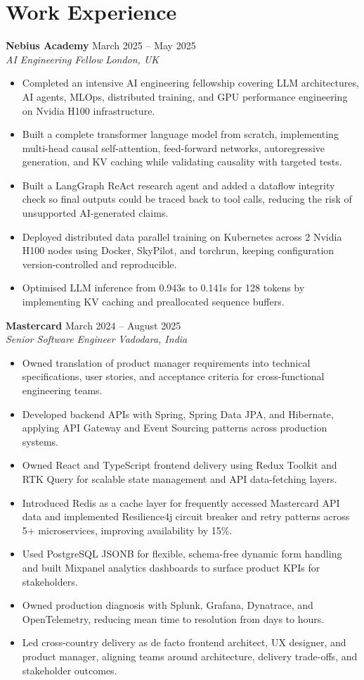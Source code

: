 \documentclass[a4paper,10pt]{article}
\newcommand{\role}[4]{
  \textbf{\color{accent}#1} \hfill {\small #2}\\
  \textit{#3} \hfill {\small \textit{#4}}
}
\begin{document}
\section{Work Experience}
\role{Nebius Academy}{March 2025 -- May 2025}{AI Engineering Fellow}{London, UK}
\begin{itemize}
  \item Completed an intensive AI engineering fellowship covering LLM architectures, AI agents, MLOps, distributed training, and GPU performance engineering on Nvidia H100 infrastructure.
  \item Built a complete transformer language model from scratch, implementing multi-head causal self-attention, feed-forward networks, autoregressive generation, and KV caching while validating causality with targeted tests.
  \item Built a LangGraph ReAct research agent and added a dataflow integrity check so final outputs could be traced back to tool calls, reducing the risk of unsupported AI-generated claims.
  \item Deployed distributed data parallel training on Kubernetes across 2 Nvidia H100 nodes using Docker, SkyPilot, and torchrun, keeping configuration version-controlled and reproducible.
  \item Optimised LLM inference from 0.943s to 0.141s for 128 tokens by implementing KV caching and preallocated sequence buffers.
\end{itemize}

\role{Mastercard}{March 2024 -- August 2025}{Senior Software Engineer}{Vadodara, India}
\begin{itemize}
  \item Owned translation of product manager requirements into technical specifications, user stories, and acceptance criteria for cross-functional engineering teams.
  \item Developed backend APIs with Spring, Spring Data JPA, and Hibernate, applying API Gateway and Event Sourcing patterns across production systems.
  \item Owned React and TypeScript frontend delivery using Redux Toolkit and RTK Query for scalable state management and API data-fetching layers.
  \item Introduced Redis as a cache layer for frequently accessed Mastercard API data and implemented Resilience4j circuit breaker and retry patterns across 5+ microservices, improving availability by 15\%.
  \item Used PostgreSQL JSONB for flexible, schema-free dynamic form handling and built Mixpanel analytics dashboards to surface product KPIs for stakeholders.
  \item Owned production diagnosis with Splunk, Grafana, Dynatrace, and OpenTelemetry, reducing mean time to resolution from days to hours.
  \item Led cross-country delivery as de facto frontend architect, UX designer, and product manager, aligning teams around architecture, delivery trade-offs, and stakeholder outcomes.
\end{itemize}
\end{document}
